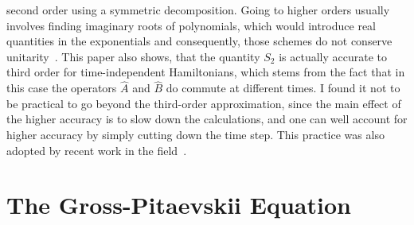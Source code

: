 second order using a symmetric decomposition. Going to higher orders usually involves finding imaginary roots of polynomials, which
would introduce real quantities in the exponentials and consequently, those schemes do not conserve
unitarity~\cite{bandraukshen2}. This paper also shows, that the quantity $S_2$ is actually accurate to third order for
time-independent Hamiltonians, which stems from the fact that in this case the operators $\hat{A}$ and $\hat{B}$ do commute at
different times. 
I found it not to be practical to go beyond the third-order approximation, since the main effect of the higher accuracy is to slow down the calculations, and one can 
well account for higher accuracy by simply cutting down the time step. This practice was also adopted by recent work in the field~\cite{gardinerjaksch}. 

\section{The Gross-Pitaevskii Equation}
